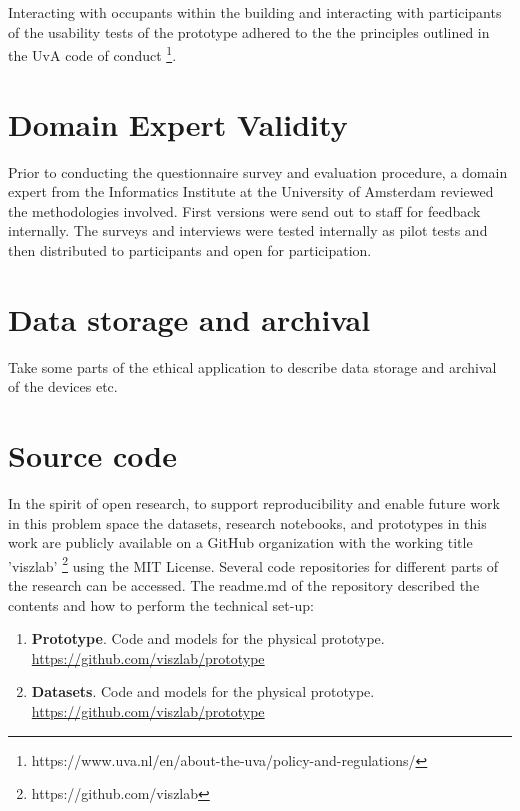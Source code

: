 \begin{appendices}
Interacting with occupants within the building and interacting with participants of the usability tests of the prototype adhered to the the principles outlined in the UvA code of conduct \footnote{https://www.uva.nl/en/about-the-uva/policy-and-regulations/}.

\section{Domain Expert Validity}
\label{sec:apx:first_appendix}

Prior to conducting the questionnaire survey and evaluation procedure, a domain expert from the Informatics Institute at the University of Amsterdam reviewed the methodologies involved. First versions were send out to staff for feedback internally. The surveys and interviews were tested internally as pilot tests and then distributed to participants and open for participation. 

\section{Data storage and archival}
\label{sec:apx:first_appendix}

Take some parts of the ethical application to describe data storage and archival of the devices etc.

\section{Source code}

In the spirit of open research, to support reproducibility and enable future work in this problem space the datasets, research notebooks, and prototypes in this work are publicly available on a GitHub organization with the working title 'viszlab' \footnote{https://github.com/viszlab} using the MIT License. Several code repositories for different parts of the research can be accessed. The readme.md of the repository described the contents and how to perform the technical set-up:

\begin{enumerate}
  \item \textbf{Prototype}. Code and models for the physical prototype.\\
  \underline{https://github.com/viszlab/prototype}
  \item \textbf{Datasets}. Code and models for the physical prototype.\\
  \underline{https://github.com/viszlab/prototype}
\end{enumerate}


\end{appendices}
